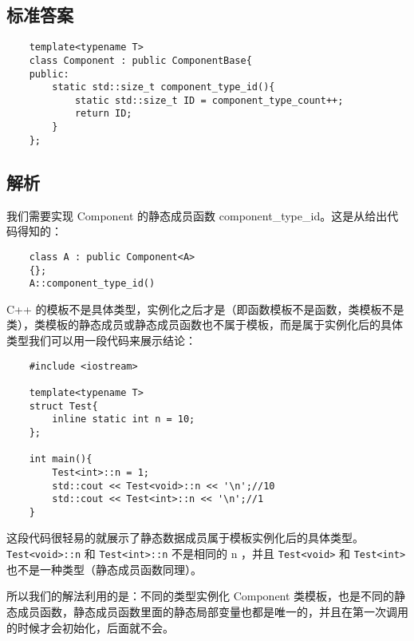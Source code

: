 

\subsection{标准答案}

\begin{verbatim}
    template<typename T>
    class Component : public ComponentBase{
    public:
        static std::size_t component_type_id(){
            static std::size_t ID = component_type_count++;
            return ID;
        }
    };
\end{verbatim}

\subsection{解析}

我们需要实现 Component 的静态成员函数 component\_type\_id。这是从给出代码得知的：

\begin{verbatim}
    class A : public Component<A>
    {};
    A::component_type_id()
\end{verbatim}

C++ 的模板不是具体类型，实例化之后才是（即函数模板不是函数，类模板不是类），类模板的静态成员或静态成员函数也不属于模板，而是属于实例化后的具体类型我们可以用一段代码来展示结论：

\begin{verbatim}
    #include <iostream>

    template<typename T>
    struct Test{
        inline static int n = 10;
    };
    
    int main(){
        Test<int>::n = 1;
        std::cout << Test<void>::n << '\n';//10
        std::cout << Test<int>::n << '\n';//1
    }
\end{verbatim}

这段代码很轻易的就展示了静态数据成员属于模板实例化后的具体类型。 \texttt{Test<void>::n} 和 \texttt{Test<int>::n} 不是相同的 n
，并且 \texttt{Test<void>} 和 \texttt{Test<int>} 也不是一种类型（静态成员函数同理）。

所以我们的解法利用的是：不同的类型实例化 Component 类模板，也是不同的静态成员函数，静态成员函数里面的静态局部变量也都是唯一的，并且在第一次调用的时候才会初始化，后面就不会。

\clearpage